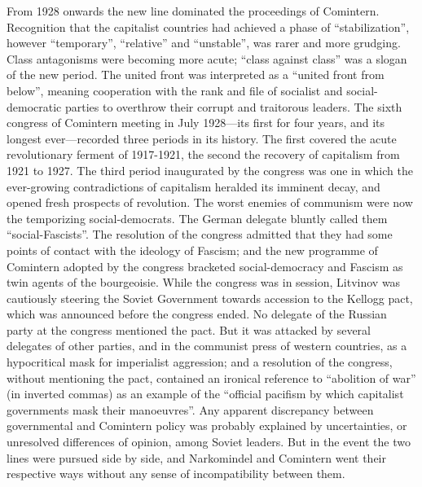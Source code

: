 From 1928 onwards the new line dominated the proceedings of Comintern. Recognition that the capitalist countries had achieved a phase of ``stabilization'', however ``temporary'', ``relative'' and ``unstable'', was rarer and more grudging. Class antagonisms were becoming more acute; ``class against class'' was a slogan of the new period. The united front was interpreted as a ``united front from below'', meaning cooperation with the rank and file of socialist and social-democratic parties to overthrow their corrupt and traitorous leaders. The sixth congress of Comintern meeting in July 1928---its first for four years, and its longest ever---recorded three periods in its history. The first covered the acute revolutionary ferment of 1917-1921, the second the recovery of capitalism from 1921 to 1927. The third period inaugurated by the congress was one in which the ever-growing contradictions of capitalism heralded its imminent decay, and opened fresh prospects of revolution. The worst enemies of communism were now the temporizing social-democrats. The German delegate bluntly called them ``social-Fascists''. The resolution of the congress admitted that they had some points of contact with the ideology of Fascism; and the new programme of Comintern adopted by the congress bracketed social-democracy and Fascism as twin agents of the bourgeoisie. While the congress was in session, Litvinov was cautiously steering the Soviet Government towards accession to the Kellogg pact, which was announced before the congress ended. No delegate of the Russian party at the congress mentioned the pact. But it was attacked by several delegates of other parties, and in the communist press of western countries, as a hypocritical mask for imperialist aggression; and a resolution of the congress, without mentioning the pact, contained an ironical reference to ``abolition of war'' (in inverted commas) as an example of the ``official pacifism by which capitalist governments mask their manoeuvres''. Any apparent discrepancy between governmental and Comintern policy was probably explained by uncertainties, or unresolved differences of opinion, among Soviet leaders. But in the event the two lines were pursued side by side, and Narkomindel and Comintern went their respective ways without any sense of incompatibility between them. 

